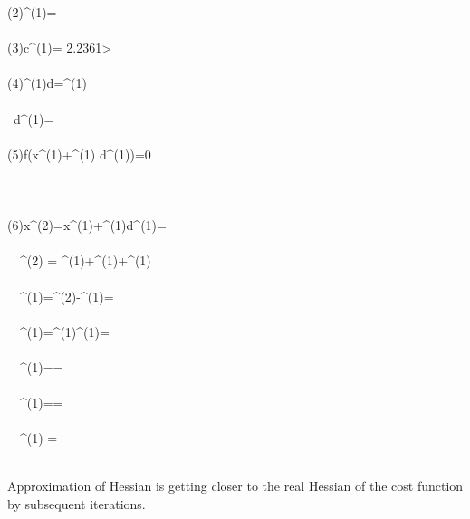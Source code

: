 \documentclass[]{report}
\begin{document}
\begin{program}
\left(2\right)\quad {}^{(1)}=\left[-1 \ , \ -2\right]\\~  \\
\left(3\right)\quad \lvert \mathbf c^{(1)}\rvert= 2.2361>\epsilon\\~  \\
\left(4\right)^{(1)}\mathbf d=^{(1)}\\~  \\
\quad \quad \quad \ \mathbf d^{(1)}=\left[\begin{array}{c}   -0.8046 \\ -1.1015\end{array}\right]\\~  \\
\left(5\right)\quad \delta f\left(\mathbf x^{(1)}+\alpha^{(1)} \mathbf d^{(1)}\right)=0\\~\\
\quad \quad \quad {}\\~\\
\left(6\right)\quad \mathbf x^{(2)}=\mathbf x^{(1)}+\alpha^{(1)}\mathbf d^{(1)}=\left[-0.3110 \ , \ -0.0777\right]\\~  \\
\quad \quad \ \  ^{(2)} = ^{(1)}+^{(1)}+^{(1)}\\~  \\
\quad \quad \ \ ^{(1)}=^{(2)}-^{(1)}=\left[\begin{array}{c}     2.9297\\1.7728\end{array}\right]\\~  \\
\quad \quad \ \ ^{(1)}=\alpha^{(1)}^{(1)}=\left[\begin{array}{c}   0.9297\\1.2728\end{array}\right]\\~  \\
\quad \quad \ \ ^{(1)}==\left[\begin{array}{cc}-0.2045  &  0.9632\\ 0.9632 &  -4.5369\end{array}\right]\\~  \\
\quad \quad \ \ ^{(1)}==\left[\begin{array}{cc}      0.3325 &   0.6650\\  0.6650   & 1.3300\end{array}\right]\\~  \\
\quad \quad \ \  ^{(1)} =\left[\begin{array}{cc}     8.4075 &  -3.5115\\-3.5115 &   2.3630\end{array}\right]
\end{program}
~\\
Approximation of Hessian is getting closer to the real Hessian of the cost function by subsequent iterations.



\end{document}
